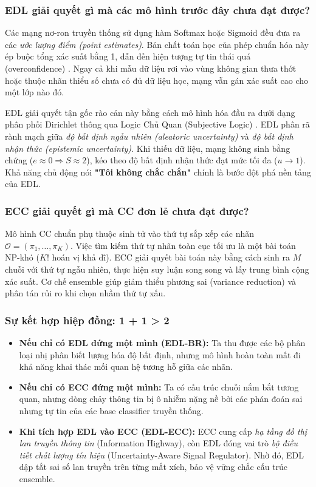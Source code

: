 \documentclass[1p,times]{elsarticle}
\begin{document}
\subsubsection{EDL giải quyết gì mà các mô hình trước đây chưa đạt được?}
Các mạng nơ-ron truyền thống sử dụng hàm Softmax hoặc Sigmoid đều đưa ra các \textit{ước lượng điểm (point estimates)}. Bản chất toán học của phép chuẩn hóa này ép buộc tổng xác suất bằng 1, dẫn đến hiện tượng tự tin thái quá (overconfidence) \citep{guo2017calibration}. Ngay cả khi mẫu dữ liệu rơi vào vùng không gian thưa thớt hoặc thuộc nhãn thiểu số chưa có đủ dữ liệu học, mạng vẫn gán xác suất cao cho một lớp nào đó. 

EDL giải quyết tận gốc rào cản này bằng cách mô hình hóa đầu ra dưới dạng phân phối Dirichlet thông qua Logic Chủ Quan (Subjective Logic) \citep{josang2016subjective, sensoy2018evidential}. EDL phân rã rành mạch giữa \textit{độ bất định ngẫu nhiên (aleatoric uncertainty)} và \textit{độ bất định nhận thức (epistemic uncertainty)}. Khi thiếu dữ liệu, mạng không sinh bằng chứng ($e \approx 0 \Rightarrow S \approx 2$), kéo theo độ bất định nhận thức đạt mức tối đa ($u \to 1$). Khả năng chủ động nói \textbf{"Tôi không chắc chắn"} chính là bước đột phá nền tảng của EDL.

\subsubsection{ECC giải quyết gì mà CC đơn lẻ chưa đạt được?}
Mô hình CC chuẩn phụ thuộc sinh tử vào thứ tự sắp xếp các nhãn $\mathcal{O} = (\pi_1, \dots, \pi_K)$. Việc tìm kiếm thứ tự nhãn toàn cục tối ưu là một bài toán NP-khó ($K!$ hoán vị khả dĩ). ECC giải quyết bài toán này bằng cách sinh ra $M$ chuỗi với thứ tự ngẫu nhiên, thực hiện suy luận song song và lấy trung bình cộng xác suất. Cơ chế ensemble giúp giảm thiểu phương sai (variance reduction) và phân tán rủi ro khi chọn nhầm thứ tự xấu.

\subsubsection{Sự kết hợp hiệp đồng: 1 + 1 > 2}
\begin{itemize}
    \item \textbf{Nếu chỉ có EDL đứng một mình (EDL-BR):} Ta thu được các bộ phân loại nhị phân biết lượng hóa độ bất định, nhưng mô hình hoàn toàn mất đi khả năng khai thác mối quan hệ tương hỗ giữa các nhãn.
    \item \textbf{Nếu chỉ có ECC đứng một mình:} Ta có cấu trúc chuỗi nắm bắt tương quan, nhưng dòng chảy thông tin bị ô nhiễm nặng nề bởi các phán đoán sai nhưng tự tin của các base classifier truyền thống.
    \item \textbf{Khi tích hợp EDL vào ECC (EDL-ECC):} ECC cung cấp \textit{hạ tầng đồ thị lan truyền thông tin} (Information Highway), còn EDL đóng vai trò \textit{bộ điều tiết chất lượng tín hiệu} (Uncertainty-Aware Signal Regulator). Nhờ đó, EDL dập tắt sai số lan truyền trên từng mắt xích, bảo vệ vững chắc cấu trúc ensemble.
\end{itemize}
\end{document}
